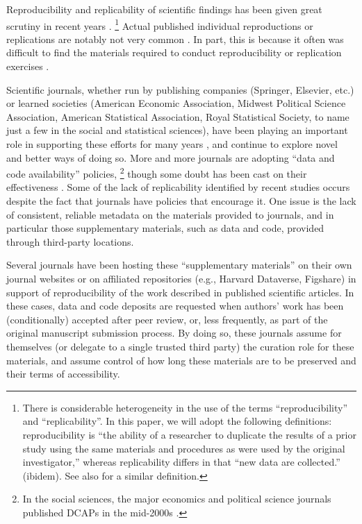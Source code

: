 Reproducibility and replicability of scientific findings has been given great scrutiny in recent years \parencite{CamererScience2016,Collaboration2015-ev,Klein2014,FanelliPNAS2018}.%
\footnote{There is considerable heterogeneity in the use of the terms
	``reproducibility'' and ``replicability''. In this paper, we will adopt
	the following definitions: reproducibility is ``the ability of a
	researcher to duplicate the results of a prior study using the same
	materials and procedures as were used by the original investigator,''
	\parencite{Bollen2015} whereas replicability
	differs in that ``new data are collected.'' (ibidem). See also \cite{NationalAcademiesofSciencesEngineeringandMedicine2019} for a similar definition.}
%
Actual published individual reproductions or replications are notably not very common \parencite[in economics, see][]{BellMiller2013b,Duvendack2017}. In part, this is because it often was difficult to find the materials required to conduct reproducibility or replication exercises \parencite{Dewald1986,McCullough2006,McCullough03}.  

Scientific journals, whether run by publishing companies (Springer, Elsevier, etc.) or learned societies (American Economic Association, Midwest Political Science Association, American Statistical Association, Royal Statistical Society, to name just a few in the social and statistical sciences), have been playing an important role in supporting these efforts for many years \parencite{stodden_enhancing_2016}, and continue to explore novel and better ways of doing so. More and more journals are adopting ``data and code availability'' policies,%
\footnote{In the social sciences, the major economics and political science journals published \acp{DCAP} in the mid-2000s \parencite{American_Economic_Association2008-wayback,nicholaseubankThePoliticalMethodologist2014}.}
though some doubt has been cast on their effectiveness \parencite{stodden_toward_2013,StoddenPNAS2018,Hoeffler2017,ChangAm.Econ.Rev.2017}. Some of the lack of replicability identified by recent studies \parencite{Hoeffler2017a,Chang2017,ChangLi2015,CamererEvaluatingreplicabilitylaboratory2016,StoddenPNAS2018}  occurs despite the fact that journals have  policies that encourage it. One issue is the lack of consistent, reliable metadata on the materials provided to journals, and in particular those supplementary materials, such as data and code, provided through third-party locations.

Several journals have been hosting these ``supplementary materials'' on their own journal websites or on affiliated repositories (e.g., Harvard Dataverse, Figshare) in support of reproducibility of the work described in published scientific articles. In these cases, data and code deposits are requested when authors' work has been (conditionally) accepted after peer review, or, less frequently, as part of the original manuscript submission process. By doing so, these journals assume for themselves (or delegate to a single trusted third party) the curation role for these materials, and assume control of how long these materials are to be preserved and their terms of accessibility.

